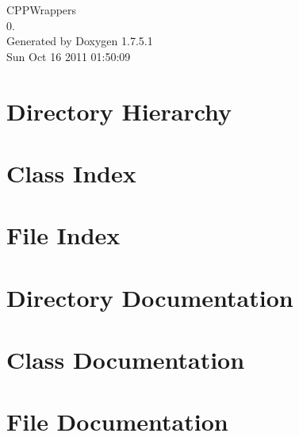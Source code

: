 \documentclass[a4paper]{book}
\begin{document}
\hypersetup{pageanchor=false,citecolor=blue}
\begin{titlepage}
\vspace*{7cm}
\begin{center}
{\Large \-C\-P\-P\-Wrappers \\[1ex]\large 0. }\\
\vspace*{1cm}
{\large \-Generated by Doxygen 1.7.5.1}\\
\vspace*{0.5cm}
{\small Sun Oct 16 2011 01:50:09}\\
\end{center}
\end{titlepage}
\clearemptydoublepage
{}
\tableofcontents
\clearemptydoublepage
{}
\hypersetup{pageanchor=true,citecolor=blue}
\chapter{\-Directory \-Hierarchy}

\chapter{\-Class \-Index}

\chapter{\-File \-Index}

\chapter{\-Directory \-Documentation}





\chapter{\-Class \-Documentation}









\chapter{\-File \-Documentation}

















\printindex
\end{document}
